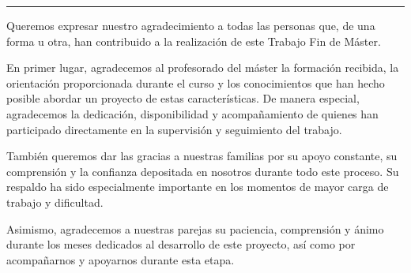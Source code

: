 \thispagestyle{TFMFront}
\vspace*{2cm}
\hfill\begin{minipage}{71mm}
  \vspace{2.4mm}\rule{\linewidth}{0.5pt}
\end{minipage}
\par\vspace{12mm}

Queremos expresar nuestro agradecimiento a todas las personas que, de una forma u otra,
han contribuido a la realización de este Trabajo Fin de Máster.

En primer lugar, agradecemos al profesorado del máster la formación recibida, la
orientación proporcionada durante el curso y los conocimientos que han hecho posible
abordar un proyecto de estas características. De manera especial, agradecemos la
dedicación, disponibilidad y acompañamiento de quienes han participado directamente en
la supervisión y seguimiento del trabajo.

También queremos dar las gracias a nuestras familias por su apoyo constante, su
comprensión y la confianza depositada en nosotros durante todo este proceso. Su respaldo
ha sido especialmente importante en los momentos de mayor carga de trabajo y dificultad.

Asimismo, agradecemos a nuestras parejas su paciencia, comprensión y ánimo durante los
meses dedicados al desarrollo de este proyecto, así como por acompañarnos y apoyarnos
durante esta etapa.

\clearpage
